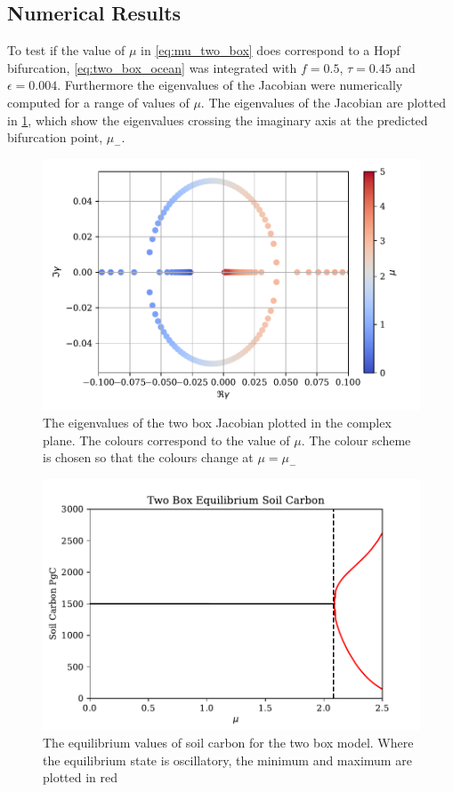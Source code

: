 \subsection{Numerical Results}
To test if the value of $\mu$ in \cref{eq:mu_two_box} does correspond to a Hopf bifurcation, \cref{eq:two_box_ocean} was integrated with $f = 0.5$, $\tau = 0.45$ and $\epsilon = 0.004$.
Furthermore the eigenvalues of the Jacobian were numerically computed for a range of values of $\mu$. The eigenvalues of the Jacobian are plotted in \cref{fig:eigen_values_of_the_jacobian},
which show the eigenvalues crossing the imaginary axis at the predicted bifurcation point, $\mu_-$.
\begin{figure}
  \centering
  \includegraphics[width=\textwidth,keepaspectratio]{complex_plane_two_box_eig}
  \caption{The eigenvalues of the two box Jacobian plotted in the complex plane. The colours correspond to the value of $\mu$. The colour scheme is chosen so that the colours change at $\mu = \mu_-$ }
  \label{fig:eigen_values_of_the_jacobian}
\end{figure}
\begin{figure}
  \centering
  \includegraphics[keepaspectratio,width=\textwidth]{two_box_model_soil_carbon_equilibrium}
  \caption{The equilibrium values of soil carbon for the two box model. Where the equilibrium state is oscillatory, the minimum and maximum are plotted in red}
  \label{fig:two_box_bf_diagram}
\end{figure}
